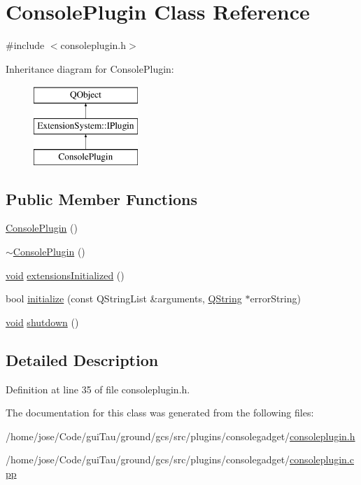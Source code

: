 \hypertarget{class_console_plugin}{\section{Console\-Plugin Class Reference}
\label{class_console_plugin}
}


{\ttfamily \#include $<$consoleplugin.\-h$>$}

Inheritance diagram for Console\-Plugin\-:\begin{figure}[H]
\begin{center}
\leavevmode
\includegraphics[height=3.000000cm]{class_console_plugin}
\end{center}
\end{figure}
\subsection*{Public Member Functions}
\begin{DoxyCompactItemize}
\item 
\hyperlink{group___console_plugin_ga1200bf1b46402c602901b2444d697eb9}{Console\-Plugin} ()
\item 
\hyperlink{group___console_plugin_ga052ccde553f4cd9ef381d5035141b863}{$\sim$\-Console\-Plugin} ()
\item 
\hyperlink{group___u_a_v_objects_plugin_ga444cf2ff3f0ecbe028adce838d373f5c}{void} \hyperlink{group___console_plugin_ga85a6a6c06db877c20f7a07d780d8b475}{extensions\-Initialized} ()
\item 
bool \hyperlink{group___console_plugin_ga16272a47e2f07a68477d2c8c949dd1a7}{initialize} (const Q\-String\-List \&arguments, \hyperlink{group___u_a_v_objects_plugin_gab9d252f49c333c94a72f97ce3105a32d}{Q\-String} $\ast$error\-String)
\item 
\hyperlink{group___u_a_v_objects_plugin_ga444cf2ff3f0ecbe028adce838d373f5c}{void} \hyperlink{group___console_plugin_gaa3ff74c08dc36f2a1ba79357ab45319a}{shutdown} ()
\end{DoxyCompactItemize}


\subsection{Detailed Description}


Definition at line 35 of file consoleplugin.\-h.



The documentation for this class was generated from the following files\-:\begin{DoxyCompactItemize}
\item 
/home/jose/\-Code/gui\-Tau/ground/gcs/src/plugins/consolegadget/\hyperlink{consoleplugin_8h}{consoleplugin.\-h}\item 
/home/jose/\-Code/gui\-Tau/ground/gcs/src/plugins/consolegadget/\hyperlink{consoleplugin_8cpp}{consoleplugin.\-cpp}\end{DoxyCompactItemize}
